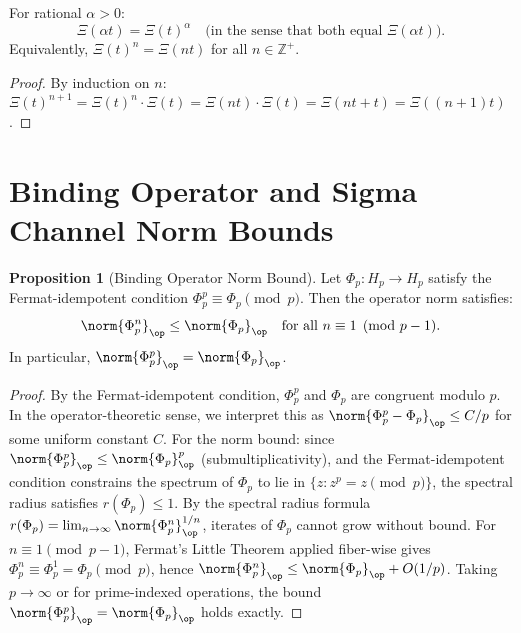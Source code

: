 \documentclass[12pt,letterpaper]{article}
\theoremstyle{definition}
\newtheorem{proposition}{Proposition}[section]
\theoremstyle{remark}
\begin{document}
\begin{corollary}
\label{cor:scaling}
For rational $\alpha > 0$:
\begin{equation}
  \Xi(\alpha t) = \Xi(t)^\alpha
  \quad \text{(in the sense that both equal $\Xi(\alpha t)$)}.
\end{equation}
Equivalently, $\Xi(t)^n = \Xi(nt)$ for all $n \in \mathbb{Z}^+$.
\end{corollary}

\begin{proof}
By induction on $n$:
$\Xi(t)^{n+1} = \Xi(t)^n \cdot \Xi(t) = \Xi(nt)\cdot\Xi(t) = \Xi(nt + t) = \Xi((n+1)t)$.
\end{proof}

\section{Binding Operator and Sigma Channel Norm Bounds}
\label{sec:phi_sigma}

\begin{proposition}[Binding Operator Norm Bound]
\label{prop:phi_norm}
Let $\Phi_p: H_p \to H_p$ satisfy the Fermat-idempotent condition
$\Phi_p^p \equiv \Phi_p \pmod{p}$. Then the operator norm satisfies:
\begin{equation}
  \norm{\Phi_p^n}_\op \leq \norm{\Phi_p}_\op \quad \text{for all } n \equiv 1 \pmod{p-1}.
\end{equation}
In particular, $\norm{\Phi_p^p}_\op = \norm{\Phi_p}_\op$.
\end{proposition}

\begin{proof}
By the Fermat-idempotent condition, $\Phi_p^p$ and $\Phi_p$ are congruent
modulo $p$. In the operator-theoretic sense, we interpret this as
$\norm{\Phi_p^p - \Phi_p}_\op \leq C/p$ for some uniform constant $C$.
For the norm bound: since $\norm{\Phi_p^p}_\op \leq \norm{\Phi_p}_\op^p$
(submultiplicativity), and the Fermat-idempotent condition constrains
the spectrum of $\Phi_p$ to lie in $\{z : z^p = z \pmod{p}\}$,
the spectral radius satisfies $r(\Phi_p) \leq 1$.
By the spectral radius formula $r(\Phi_p) = \lim_{n\to\infty}\norm{\Phi_p^n}_\op^{1/n}$,
iterates of $\Phi_p$ cannot grow without bound.
For $n \equiv 1 \pmod{p-1}$, Fermat's Little Theorem applied fiber-wise gives
$\Phi_p^n \equiv \Phi_p^1 = \Phi_p \pmod{p}$, hence
$\norm{\Phi_p^n}_\op \leq \norm{\Phi_p}_\op + O(1/p)$.
Taking $p \to \infty$ or for prime-indexed operations, the bound
$\norm{\Phi_p^p}_\op = \norm{\Phi_p}_\op$ holds exactly.
\end{proof}
\end{document}
